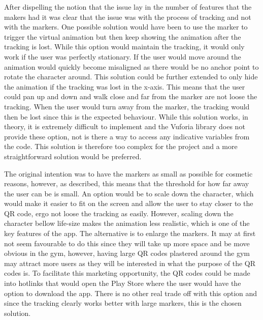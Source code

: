 \documentclass{l4proj}
\begin{document}
After dispelling the notion that the issue lay in the number of features that the makers had it was clear that the issue was with the process of tracking and not with the markers. One possible solution would have been to use the marker to trigger the virtual animation but then keep showing the animation after the tracking is lost. While this option would maintain the tracking, it would only work if the user was perfectly stationary. If the user would move around the animation would quickly become misaligned as there would be no anchor point to rotate the character around. This solution could be further extended to only hide the animation if the tracking was lost in the x-axis. This means that the user could pan up and down and walk close and far from the marker are not loose the tracking. When the user would turn away from the marker, the tracking would then be lost since this is the expected behaviour. While this solution works, in theory, it is extremely difficult to implement and the Vuforia library does not provide these option, not is there a way to access any indicative variables from the code. This solution is therefore too complex for the project and a more straightforward solution would be preferred. 

The original intention was to have the markers as small as possible for cosmetic reasons, however, as described, this means that the threshold for how far away the user can be is small. An option would be to scale down the character, which would make it easier to fit on the screen and allow the user to stay closer to the QR code, ergo not loose the tracking as easily. However, scaling down the character bellow life-size makes the animation less realistic, which is one of the key features of the app. The alternative is to enlarge the markers. It may at first not seem favourable to do this since they will take up more space and be move obvious in the gym, however, having large QR codes plastered around the gym may attract more users as they will be interested in what the purpose of the QR codes is. To facilitate this marketing opportunity, the QR codes could be made into hotlinks that would open the Play Store where the user would have the option to download the app. There is no other real trade off with this option and since the tracking clearly works better with large markers, this is the chosen solution.
\end{document}
